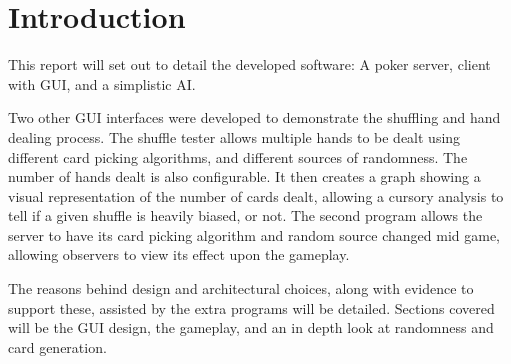 \section{Introduction}
This report will set out to detail the developed software: A poker server,
client with GUI, and a simplistic AI\@. 

Two other GUI interfaces were developed to demonstrate the shuffling and
hand dealing process. The shuffle tester allows multiple hands to be dealt 
using different card picking algorithms, and different sources of randomness.
The number of hands dealt is also configurable. It then creates a graph 
showing a visual representation of the number of cards dealt, allowing a
cursory analysis to tell if a given shuffle is heavily biased, or not.
The second program allows the server to have its card picking algorithm
and random source changed mid game, allowing observers to view its effect
upon the gameplay.

The reasons behind design and architectural choices, along with evidence to 
support these, assisted by the extra programs will be detailed. Sections 
covered  will be the GUI design, the gameplay, and an in depth look at 
randomness and card generation.
